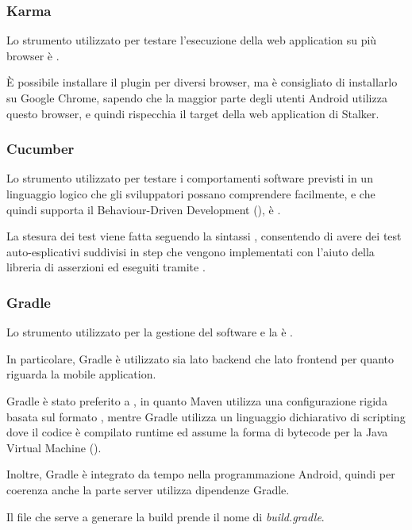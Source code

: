 \documentclass[../../../manuale-manutentore.tex]{subfiles}
\begin{document}

\subsubsection{Karma}%
\label{subs:karma}

Lo strumento utilizzato per testare l'esecuzione della web application su più browser è .

È possibile installare il plugin per diversi browser, ma è consigliato di installarlo su Google Chrome, sapendo che la maggior parte degli utenti Android utilizza questo browser, e quindi rispecchia il target della web application di Stalker.

\subsubsection{Cucumber}%
\label{subs:cucumber}

Lo strumento utilizzato per testare i comportamenti software previsti in un linguaggio logico che gli sviluppatori possano comprendere facilmente, e che quindi supporta il Behaviour-Driven Development (), è .

La stesura dei test viene fatta seguendo la sintassi , consentendo di avere dei test auto-esplicativi suddivisi in step che vengono implementati con l'aiuto della libreria di asserzioni  ed eseguiti tramite .

\subsubsection{Gradle}%
\label{subs:gradle}

Lo strumento utilizzato per la gestione del software e la  è .

In particolare, Gradle è utilizzato sia lato backend che lato frontend per quanto riguarda la mobile application.

Gradle è stato preferito a , in quanto Maven utilizza una configurazione rigida basata sul formato , mentre Gradle utilizza un linguaggio dichiarativo di scripting  dove il codice è compilato runtime ed assume la forma di bytecode per la Java Virtual Machine ().

Inoltre, Gradle è integrato da tempo nella programmazione Android, quindi per coerenza anche la parte server utilizza dipendenze Gradle.

Il file che serve a generare la build prende il nome di \textit{build.gradle}.
\end{document}

